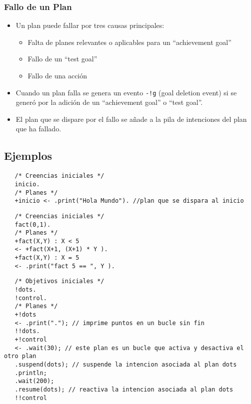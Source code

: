 \subsubsection{Fallo de un Plan}
\begin{itemize}
	\item Un plan puede fallar por tres causas principales:
   \begin{itemize}
   	\item Falta de planes relevantes o aplicables para un ``achievement goal''
	\item Fallo de un ``test goal''
	\item Fallo de una acción
   \end{itemize}
	\item Cuando un plan falla se genera un evento \lstinline|-!g| (goal deletion event) si se generó por la adición de un ``achievement goal'' o ``test goal''.
	\item El plan que se dispare por el fallo se añade a la pila de intenciones del plan que ha fallado.
\end{itemize}

\subsection{Ejemplos}


\lstset{language=Java}
\begin{lstlisting}
   /* Creencias iniciales */
   inicio.
   /* Planes */
   +inicio <- .print("Hola Mundo"). //plan que se dispara al inicio
\end{lstlisting}

\begin{lstlisting}
   /* Creencias iniciales */
   fact(0,1).
   /* Planes */
   +fact(X,Y) : X < 5
   <- +fact(X+1, (X+1) * Y ).
   +fact(X,Y) : X = 5
   <- .print("fact 5 == ", Y ).
\end{lstlisting}

\begin{lstlisting}
   /* Objetivos iniciales */
   !dots.
   !control.
   /* Planes */
   +!dots
   <- .print("."); // imprime puntos en un bucle sin fin
   !!dots.
   +!control
   <- .wait(30); // este plan es un bucle que activa y desactiva el otro plan
   .suspend(dots); // suspende la intencion asociada al plan dots
   .println;
   .wait(200);
   .resume(dots); // reactiva la intencion asociada al plan dots
   !!control
\end{lstlisting}

